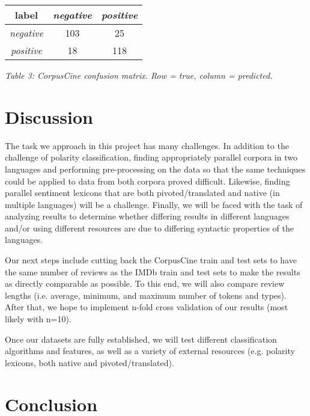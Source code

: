 \documentclass[11pt]{article}
\begin{document}
\vspace{5mm}
{\centering
\begin{tabular}{|c|c|c|}
\hline
\textbf{label} & \emph{negative} & \emph{positive} \\ \hline
\emph{negative} & 103 & 25 \\ \hline
\emph{positive} & 18 & 118 \\ \hline
\end{tabular}

\vspace{1mm}
\emph{Table 3: CorpusCine confusion matrix. Row = true, column = predicted.}
\par}

\section{Discussion}

The task we approach in this project has many challenges.  In addition to the challenge of polarity classification, finding appropriately parallel corpora in two languages and performing pre-processing on the data so that the same techniques could be applied to data from both corpora proved difficult.  Likewise, finding parallel sentiment lexicons that are both pivoted/translated and native (in multiple languages) will be a challenge.  Finally, we will be faced with the task of analyzing results to determine whether differing results in different languages and/or using different resources are due to differing syntactic properties of the languages.

Our next steps include cutting back the CorpusCine train and test sets to have the same number of reviews as the IMDb train and test sets to make the results as directly comparable as possible.  To this end, we will also compare review lengths (i.e. average, minimum, and maximum number of tokens and types).  After that, we hope to implement n-fold cross validation of our results (most likely with n=10). 

Once our datasets are fully established, we will test different classification algorithms and features, as well as a variety of external resources (e.g. polarity lexicons, both native and pivoted/translated).

\section{Conclusion}

\nocite{*}




\end{document}
